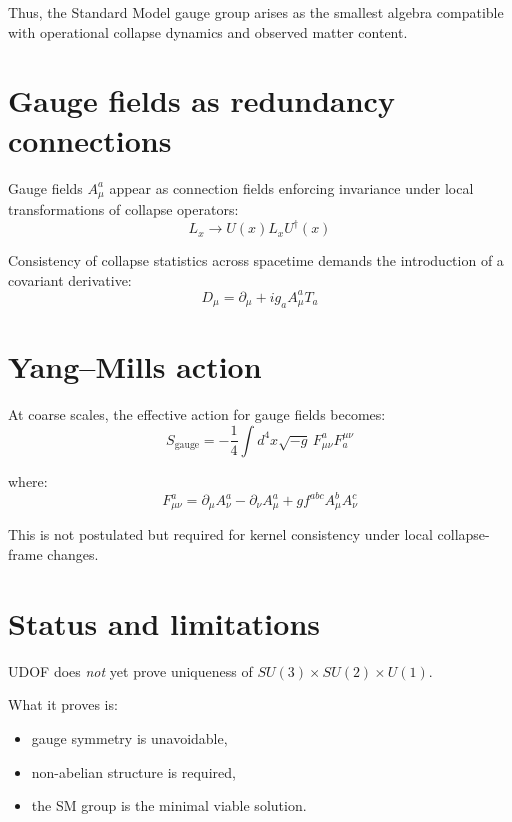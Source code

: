 \documentclass[11pt]{book}
\begin{document}
Thus, the Standard Model gauge group arises as the smallest algebra
compatible with operational collapse dynamics and observed matter content.

\section{Gauge fields as redundancy connections}

Gauge fields $A_\mu^a$ appear as connection fields enforcing invariance
under local transformations of collapse operators:
\begin{equation}
L_x \rightarrow U(x) L_x U^\dagger(x)
\end{equation}

Consistency of collapse statistics across spacetime demands the
introduction of a covariant derivative:
\begin{equation}
D_\mu = \partial_\mu + i g_a A_\mu^a T_a
\end{equation}

\section{Yang--Mills action}

At coarse scales, the effective action for gauge fields becomes:
\begin{equation}
S_{\mathrm{gauge}}
=
-\frac{1}{4}\int d^4x \sqrt{-g}\,
F_{\mu\nu}^a F^{\mu\nu}_a
\end{equation}

where:
\begin{equation}
F_{\mu\nu}^a
=
\partial_\mu A_\nu^a
-
\partial_\nu A_\mu^a
+
g f^{abc} A_\mu^b A_\nu^c
\end{equation}

This is not postulated but required for kernel consistency under
local collapse-frame changes.

\section{Status and limitations}

UDOF does \emph{not} yet prove uniqueness of
$SU(3)\times SU(2)\times U(1)$.

What it proves is:
\begin{itemize}
\item gauge symmetry is unavoidable,
\item non-abelian structure is required,
\item the SM group is the minimal viable solution.
\end{itemize}
\end{document}

